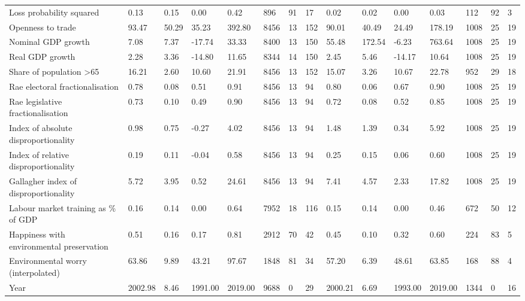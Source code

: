\begin{longtable}{lllllllllllllll}
Loss probability squared & 0.13 & 0.15 & 0.00 & 0.42 & 896 & 91 & 17 & 0.02 & 0.02 & 0.00 & 0.03 & 112 & 92 & 3\\
Openness to trade & 93.47 & 50.29 & 35.23 & 392.80 & 8456 & 13 & 152 & 90.01 & 40.49 & 24.49 & 178.19 & 1008 & 25 & 19\\
Nominal GDP growth & 7.08 & 7.37 & -17.74 & 33.33 & 8400 & 13 & 150 & 55.48 & 172.54 & -6.23 & 763.64 & 1008 & 25 & 19\\
Real GDP growth & 2.28 & 3.36 & -14.80 & 11.65 & 8344 & 14 & 150 & 2.45 & 5.46 & -14.17 & 10.64 & 1008 & 25 & 19\\
\addlinespace
Share of population >65 & 16.21 & 2.60 & 10.60 & 21.91 & 8456 & 13 & 152 & 15.07 & 3.26 & 10.67 & 22.78 & 952 & 29 & 18\\
Rae electoral fractionalisation & 0.78 & 0.08 & 0.51 & 0.91 & 8456 & 13 & 94 & 0.80 & 0.06 & 0.67 & 0.90 & 1008 & 25 & 19\\
Rae legislative fractionalisation & 0.73 & 0.10 & 0.49 & 0.90 & 8456 & 13 & 94 & 0.72 & 0.08 & 0.52 & 0.85 & 1008 & 25 & 19\\
Index of absolute disproportionality & 0.98 & 0.75 & -0.27 & 4.02 & 8456 & 13 & 94 & 1.48 & 1.39 & 0.34 & 5.92 & 1008 & 25 & 19\\
Index of relative disproportionality & 0.19 & 0.11 & -0.04 & 0.58 & 8456 & 13 & 94 & 0.25 & 0.15 & 0.06 & 0.60 & 1008 & 25 & 19\\
\addlinespace
Gallagher index of disproportionality & 5.72 & 3.95 & 0.52 & 24.61 & 8456 & 13 & 94 & 7.41 & 4.57 & 2.33 & 17.82 & 1008 & 25 & 19\\
Labour market training as \% of GDP & 0.16 & 0.14 & 0.00 & 0.64 & 7952 & 18 & 116 & 0.15 & 0.14 & 0.00 & 0.46 & 672 & 50 & 12\\
Happiness with environmental preservation & 0.51 & 0.16 & 0.17 & 0.81 & 2912 & 70 & 42 & 0.45 & 0.10 & 0.32 & 0.60 & 224 & 83 & 5\\
Environmental worry (interpolated) & 63.86 & 9.89 & 43.21 & 97.67 & 1848 & 81 & 34 & 57.20 & 6.39 & 48.61 & 63.85 & 168 & 88 & 4\\
Year & 2002.98 & 8.46 & 1991.00 & 2019.00 & 9688 & 0 & 29 & 2000.21 & 6.69 & 1993.00 & 2019.00 & 1344 & 0 & 16\\
\bottomrule
\end{longtable}
